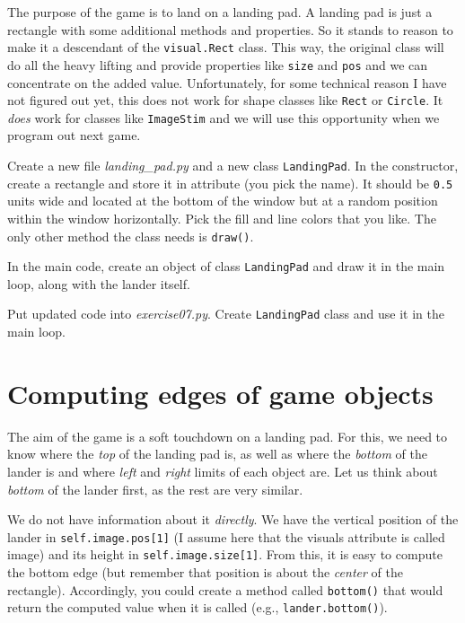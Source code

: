 \documentclass[
]{book}
\begin{document}
The purpose of the game is to land on a landing pad. A landing pad is just a rectangle with some additional methods and properties. So it stands to reason to make it a descendant of the \texttt{visual.Rect} class. This way, the original class will do all the heavy lifting and provide properties like \texttt{size} and \texttt{pos} and we can concentrate on the added value. Unfortunately, for some technical reason I have not figured out yet, this does not work for shape classes like \texttt{Rect} or \texttt{Circle}. It \emph{does} work for classes like \texttt{ImageStim} and we will use this opportunity when we program out next game.

Create a new file \emph{landing\_pad.py} and a new class \texttt{LandingPad}. In the constructor, create a rectangle and store it in attribute (you pick the name). It should be \texttt{0.5} units wide and located at the bottom of the window but at a random position within the window horizontally. Pick the fill and line colors that you like. The only other method the class needs is \texttt{draw()}.

In the main code, create an object of class \texttt{LandingPad} and draw it in the main loop, along with the lander itself.

Put updated code into \emph{exercise07.py}. Create \texttt{LandingPad} class and use it in the main loop.

\hypertarget{computing-edges-of-game-objects}{%
\section{Computing edges of game objects}\label{computing-edges-of-game-objects}}

The aim of the game is a soft touchdown on a landing pad. For this, we need to know where the \emph{top} of the landing pad is, as well as where the \emph{bottom} of the lander is and where \emph{left} and \emph{right} limits of each object are. Let us think about \emph{bottom} of the lander first, as the rest are very similar.

We do not have information about it \emph{directly}. We have the vertical position of the lander in \texttt{self.image.pos{[}1{]}} (I assume here that the visuals attribute is called image) and its height in \texttt{self.image.size{[}1{]}}. From this, it is easy to compute the bottom edge (but remember that position is about the \emph{center} of the rectangle). Accordingly, you could create a method called \texttt{bottom()} that would return the computed value when it is called (e.g., \texttt{lander.bottom()}).
\end{document}
